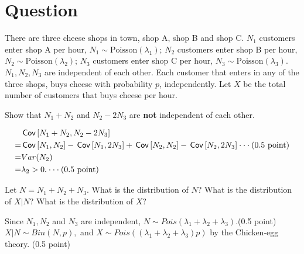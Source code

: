 \section{Question}
There are three cheese shops in town, shop A, shop B and shop C. $N_1$ customers enter shop A per hour, $N_1\sim \text{Poisson}(\lambda_1)$; $N_2$ customers enter shop B per hour, $N_2\sim \text{Poisson}(\lambda_2)$; $N_3$ customers enter shop C per hour, $N_3\sim \text{Poisson}(\lambda_3)$. $N_1, N_2, N_3$ are independent of each other. Each customer that enters in any of the three shops, buys cheese with probability $p$, independently. Let $X$ be the total number of customers that buys cheese per hour.
\begin{exercise}[1]
 Show that $N_1+N_2$ and $N_2-2N_3$ are \textbf{not} independent of each other.

\begin{solution}
\begin{align*}
   & \,\mathsf{Cov}\left[N_1+N_2, N_2-2N_3\right]\\
  = & \,\mathsf{Cov}\left[N_1,N_2\right]-\,\mathsf{Cov}\left[N_1,2N_3\right]+\,\mathsf{Cov}\left[N_2,N_2\right]-\,\mathsf{Cov}\left[N_2,2N_3\right]\cdot \cdot \cdot \text{(0.5 point)}\\
  = &  Var(N_2)\\
  =& \lambda_2 > 0.\cdot \cdot \cdot \text{(0.5 point)}
\end{align*}
\end{solution}
\end{exercise}

\begin{exercise}[1]
Let $N=N_1+N_2+N_3$. What is the distribution of  $N$? What is the distribution of $X|N$?  What is the distribution of $X$?
\begin{solution}
Since $N_1, N_2$ and $N_3$ are independent, $N\sim Pois(\lambda_1+\lambda_2+\lambda_3).$(0.5 point)\\
$X|N\sim Bin(N,p),$ and $X\sim Pois((\lambda_1+\lambda_2+\lambda_3) p)$ by the Chicken-egg theory. (0.5 point)
\end{solution}
\end{exercise}


